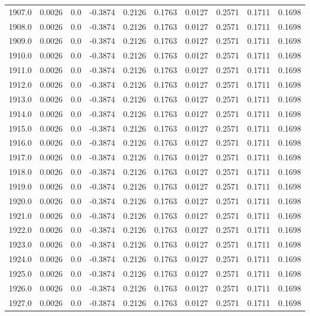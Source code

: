 \begin{longtable}{lrrrrrrrrr}
1907.0 & 0.0026 & 0.0 & -0.3874 & 0.2126 & 0.1763 & 0.0127 & 0.2571 & 0.1711 & 0.1698 \\
1908.0 & 0.0026 & 0.0 & -0.3874 & 0.2126 & 0.1763 & 0.0127 & 0.2571 & 0.1711 & 0.1698 \\
1909.0 & 0.0026 & 0.0 & -0.3874 & 0.2126 & 0.1763 & 0.0127 & 0.2571 & 0.1711 & 0.1698 \\
1910.0 & 0.0026 & 0.0 & -0.3874 & 0.2126 & 0.1763 & 0.0127 & 0.2571 & 0.1711 & 0.1698 \\
1911.0 & 0.0026 & 0.0 & -0.3874 & 0.2126 & 0.1763 & 0.0127 & 0.2571 & 0.1711 & 0.1698 \\
1912.0 & 0.0026 & 0.0 & -0.3874 & 0.2126 & 0.1763 & 0.0127 & 0.2571 & 0.1711 & 0.1698 \\
1913.0 & 0.0026 & 0.0 & -0.3874 & 0.2126 & 0.1763 & 0.0127 & 0.2571 & 0.1711 & 0.1698 \\
1914.0 & 0.0026 & 0.0 & -0.3874 & 0.2126 & 0.1763 & 0.0127 & 0.2571 & 0.1711 & 0.1698 \\
1915.0 & 0.0026 & 0.0 & -0.3874 & 0.2126 & 0.1763 & 0.0127 & 0.2571 & 0.1711 & 0.1698 \\
1916.0 & 0.0026 & 0.0 & -0.3874 & 0.2126 & 0.1763 & 0.0127 & 0.2571 & 0.1711 & 0.1698 \\
1917.0 & 0.0026 & 0.0 & -0.3874 & 0.2126 & 0.1763 & 0.0127 & 0.2571 & 0.1711 & 0.1698 \\
1918.0 & 0.0026 & 0.0 & -0.3874 & 0.2126 & 0.1763 & 0.0127 & 0.2571 & 0.1711 & 0.1698 \\
1919.0 & 0.0026 & 0.0 & -0.3874 & 0.2126 & 0.1763 & 0.0127 & 0.2571 & 0.1711 & 0.1698 \\
1920.0 & 0.0026 & 0.0 & -0.3874 & 0.2126 & 0.1763 & 0.0127 & 0.2571 & 0.1711 & 0.1698 \\
1921.0 & 0.0026 & 0.0 & -0.3874 & 0.2126 & 0.1763 & 0.0127 & 0.2571 & 0.1711 & 0.1698 \\
1922.0 & 0.0026 & 0.0 & -0.3874 & 0.2126 & 0.1763 & 0.0127 & 0.2571 & 0.1711 & 0.1698 \\
1923.0 & 0.0026 & 0.0 & -0.3874 & 0.2126 & 0.1763 & 0.0127 & 0.2571 & 0.1711 & 0.1698 \\
1924.0 & 0.0026 & 0.0 & -0.3874 & 0.2126 & 0.1763 & 0.0127 & 0.2571 & 0.1711 & 0.1698 \\
1925.0 & 0.0026 & 0.0 & -0.3874 & 0.2126 & 0.1763 & 0.0127 & 0.2571 & 0.1711 & 0.1698 \\
1926.0 & 0.0026 & 0.0 & -0.3874 & 0.2126 & 0.1763 & 0.0127 & 0.2571 & 0.1711 & 0.1698 \\
1927.0 & 0.0026 & 0.0 & -0.3874 & 0.2126 & 0.1763 & 0.0127 & 0.2571 & 0.1711 & 0.1698 \\

\end{longtable}
